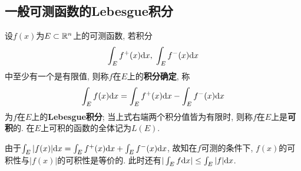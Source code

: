 %
%
\subsection{一般可测函数的Lebesgue积分}

\begin{definition}[一般可测函数的Lebesgue积分]
	设$f(x)$为$E \subset \mathbb{R}^n$上的可测函数, 若积分
	$$
		\int_E f^+ (x) \mathrm{d} x, \;
		\int_E f^- (x) \mathrm{d} x
	$$
	中至少有一个是有限值, 则称$f$在$E$上的\textbf{积分确定}, 称
	$$
		\int_E f (x) \mathrm{d} x = \int_E f^+ (x) \mathrm{d} x - \int_E f^- (x) \mathrm{d} x
	$$
	为$f$在$E$上的\textbf{Lebesgue积分}; 
	当上式右端两个积分值皆为有限时, 则称$f$在$E$上是\textbf{可积}的. 
	在$E$上可积的函数的全体记为$L(E)$.
\end{definition}

由于$\int_E |f (x)| \mathrm{d} x = \int_E f^+ (x) \mathrm{d} x + \int_E f^- (x) \mathrm{d} x$, 
故知在$f$可测的条件下, $f(x)$的可积性与$| f(x) |$的可积性是等价的. 
此时还有$|\int_E f \mathrm{d} x| \leq \int_E |f| \mathrm{d} x$. 


